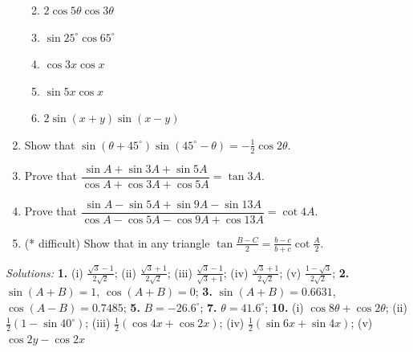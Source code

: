 \documentclass[
  12pt,
  oneside]{book}
\providecommand{\tightlist}{%
  \setlength{\itemsep}{0pt}\setlength{\parskip}{0pt}}
\theoremstyle{definition}
\theoremstyle{definition}
\theoremstyle{definition}
\theoremstyle{definition}
\theoremstyle{remark}
\begin{document}
\begin{enumerate}
  \begin{enumerate}
  \def\labelenumii{\roman{enumii})}
  \tightlist
  \item
    \(2\cos 5\theta \cos 3\theta\)
  \item
    \(\sin 25^\circ \cos 65^\circ\)
  \item
    \(\cos 3x \cos x\)
  \item
    \(\sin 5x \cos x\)
  \item
    \(2\sin (x + y) \sin (x - y)\)
  \end{enumerate}
\item
  Show that \(\sin(\theta+45^\circ)\sin(45^\circ-\theta) = -\frac{1}{2}\cos2\theta\).
\item
  Prove that \(\dfrac{\sin A+\sin 3A + \sin 5A}{\cos A+\cos 3A+\cos 5A}=\tan3A\).
\item
  Prove that \(\dfrac{\sin A-\sin 5A +\sin 9A -\sin13A}{\cos A-\cos 5A-\cos 9A+\cos 13 A}=\cot 4A\).
\item
  (* difficult) Show that in any triangle \(\tan\frac{B-C}{2}=\frac{b-c}{b+c}\cot\frac{A}{2}\).
\end{enumerate}

\emph{Solutions:}
\textbf{1.} (i) \(\frac{\sqrt{3}-1}{2\sqrt{2}}\); (ii) \(\frac{\sqrt{3}+1}{2\sqrt{2}}\); (iii) \(\frac{\sqrt{3}-1}{\sqrt{3}+1}\); (iv) \(\frac{\sqrt{3}+1}{2\sqrt{2}}\); (v) \(\frac{1-\sqrt{3}}{2\sqrt{2}}\);
\textbf{2.} \(\sin(A+B)=1\), \(\cos(A+B)=0\);
\textbf{3.} \(\sin(A+B)=0.6631\), \(\cos(A-B)=0.7485\);
\textbf{5.} \(B=-26.6^\circ\);
\textbf{7.} \(\theta= 41.6^\circ\);
\textbf{10.} (i) \(\cos8\theta+\cos2\theta\);
(ii) \(\frac12(1-\sin40^\circ)\);
(iii) \(\frac12(\cos 4x+\cos2x)\);
(iv) \(\frac12(\sin6x+\sin4x)\);
(v) \(\cos2y-\cos2x\)
\end{document}
